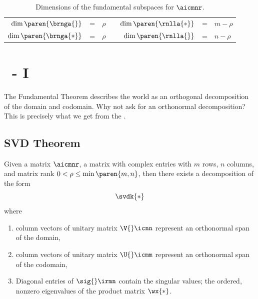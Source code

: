   \begin{table}[htbp]  %
    \caption{Dimensions of the fundamental subspaces for $\aicmnr$.}
    \begin{center}
      \begin{tabular}{rclcrcl}
        $\dim \paren{\brnga{}}$ & = & $\rho$ && $\dim \paren{\rnlla{*}}$ & = & $m - \rho$ \\
        $\dim \paren{\brnga{*}}$ & = & $\rho$ && $\dim \paren{\rnlla{}}$ & = & $n - \rho$ 
      \end{tabular}
    \end{center}
  \end{table}%


\section{\bsvd\ - I}  %
The Fundamental Theorem describes the world as an orthogonal decomposition of the domain and codomain. Why not ask for an orthonormal decomposition? This is precisely what we get from the \asvd.

\subsection{SVD Theorem}  %
Given a matrix $\aicmnr$, a matrix with complex entries with $m$ rows, $n$ columns, and matrix rank $0<\rho\le\min\paren{m,n}$, then there exists a decomposition of the form
  \begin{equation*}   %
    \svdk{*}
  \end{equation*}
where
\begin{enumerate}
  \item column vectors of unitary matrix $\V{}\icnn$ represent an orthonormal span of the domain,
  \item column vectors of unitary matrix $\U{}\icmm$ represent an orthonormal span of the codomain,
  \item Diagonal entries of $\sig{}\irmn$ contain the singular values; the ordered, nonzero eigenvalues of the product matrix $\wx{*}$.
\end{enumerate}

